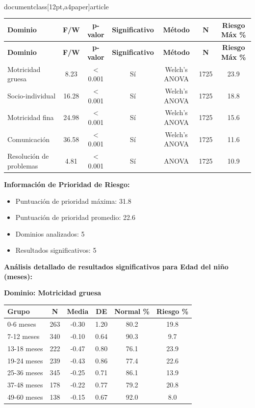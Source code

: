 \\documentclass[12pt,a4paper]{article}
\begin{document}
\begin{longtable}{|l|c|c|c|c|c|c|}
\hline
\textbf{Dominio} & \textbf{F/W} & \textbf{p-valor} & \textbf{Significativo} & \textbf{Método} & \textbf{N} & \textbf{Riesgo Máx \%} \\
\hline
\endfirsthead

\hline
\textbf{Dominio} & \textbf{F/W} & \textbf{p-valor} & \textbf{Significativo} & \textbf{Método} & \textbf{N} & \textbf{Riesgo Máx \%} \\
\hline
\endhead

\hline
\endfoot

\hline
\endlastfoot

Motricidad gruesa & 8.23 & < 0.001 & Sí & Welch's ANOVA & 1725 & 23.9 \\
Socio-individual & 16.28 & < 0.001 & Sí & Welch's ANOVA & 1725 & 18.8 \\
Motricidad fina & 24.98 & < 0.001 & Sí & Welch's ANOVA & 1725 & 15.6 \\
Comunicación & 36.58 & < 0.001 & Sí & Welch's ANOVA & 1725 & 11.6 \\
Resolución de problemas & 4.81 & < 0.001 & Sí & ANOVA & 1725 & 10.9 \\

\end{longtable}


\textbf{Información de Prioridad de Riesgo:}
\begin{itemize}
\item Puntuación de prioridad máxima: 31.8
\item Puntuación de prioridad promedio: 22.6
\item Dominios analizados: 5
\item Resultados significativos: 5
\end{itemize}


\textbf{Análisis detallado de resultados significativos para Edad del niño (meses):}


\textbf{Dominio: Motricidad gruesa}


\begin{center}
\begin{tabular}{|l|c|c|c|c|c|}
\hline
\textbf{Grupo} & \textbf{N} & \textbf{Media} & \textbf{DE} & \textbf{Normal \%} & \textbf{Riesgo \%} \\
\hline
0-6 meses & 263 & -0.30 & 1.20 & 80.2 & 19.8 \\
7-12 meses & 340 & -0.10 & 0.64 & 90.3 & 9.7 \\
13-18 meses & 222 & -0.47 & 0.80 & 76.1 & 23.9 \\
19-24 meses & 239 & -0.43 & 0.86 & 77.4 & 22.6 \\
25-36 meses & 345 & -0.25 & 0.71 & 86.1 & 13.9 \\
37-48 meses & 178 & -0.22 & 0.77 & 79.2 & 20.8 \\
49-60 meses & 138 & -0.15 & 0.67 & 92.0 & 8.0 \\

\hline
\end{tabular}
\end{center}
\end{document}
